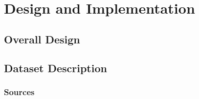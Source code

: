 \documentclass{report}
\begin{document}


\chapter{Design and Implementation}  %

\section{Overall Design}



\section{Dataset Description}  %

\subsection{Sources}

\end{document}
